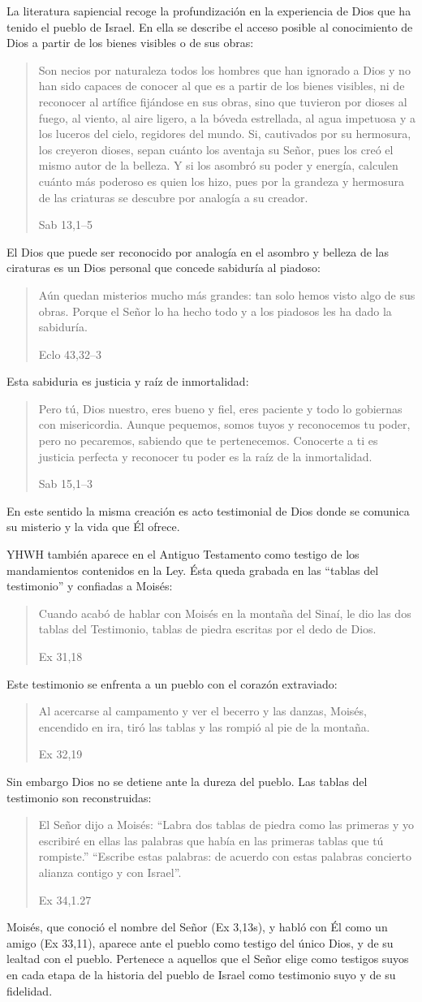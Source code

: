 La literatura sapiencial recoge la profundización en la experiencia de Dios que
ha tenido el pueblo de Israel. En ella se describe el acceso posible al
conocimiento de Dios a partir de los bienes visibles o de sus obras:
\blockquote[Sab 13,1--5]{Son necios por naturaleza todos los hombres que han
  ignorado a Dios y no han sido capaces de conocer al que es a partir de los
  bienes visibles, ni de reconocer al artífice fijándose en sus obras, sino que
  tuvieron por dioses al fuego, al viento, al aire ligero, a la bóveda
  estrellada, al agua impetuosa y a los luceros del cielo, regidores del mundo.
  Si, cautivados por su hermosura, los creyeron dioses, sepan cuánto los
  aventaja su Señor, pues los creó el mismo autor de la belleza. Y si los
  asombró su poder y energía, calculen cuánto más poderoso es quien los hizo,
  pues por la grandeza y hermosura de las criaturas se descubre por analogía a
  su creador.}

El Dios que puede ser reconocido por analogía en el asombro y belleza de las
ciraturas es un Dios personal que concede sabiduría al piadoso:
\blockquote[Eclo 43,32--3]{Aún quedan misterios mucho más grandes: tan solo
  hemos visto algo de sus obras. Porque el Señor lo ha hecho todo y a los
  piadosos les ha dado la sabiduría.}
Esta sabiduria es justicia y raíz de inmortalidad:
\blockquote[Sab 15,1--3]{Pero tú, Dios nuestro, eres bueno y fiel, eres paciente
  y todo lo gobiernas con misericordia. Aunque pequemos, somos tuyos y
  reconocemos tu poder, pero no pecaremos, sabiendo que te pertenecemos.
  Conocerte a ti es justicia perfecta y reconocer tu poder es la raíz de la
  inmortalidad.}
En este sentido la misma creación es acto testimonial de Dios donde se comunica
su misterio y la vida que Él ofrece.

YHWH también aparece en el Antiguo Testamento como testigo de los mandamientos
contenidos en la Ley.\autocite[Cf.][115]{prades2015testimonio} Ésta queda
grabada en las \enquote{tablas del testimonio} y confiadas a Moisés:
\blockquote[Ex 31,18]{Cuando acabó de hablar con Moisés en la montaña del Sinaí,
  le dio las dos tablas del Testimonio, tablas de piedra escritas por el dedo de
  Dios.}
Este testimonio se enfrenta a un pueblo con el corazón extraviado:
\blockquote[Ex 32,19]{Al acercarse al campamento y ver el becerro y las danzas,
  Moisés, encendido en ira, tiró las tablas y las rompió al pie de la montaña.}
Sin embargo Dios no se detiene ante la dureza del pueblo. Las tablas del
testimonio son reconstruidas:
\blockquote[Ex 34,1.27]{El Señor dijo a Moisés: \enquote{Labra dos tablas de
    piedra como las primeras y yo escribiré en ellas las palabras que había en
    las primeras tablas que tú rompiste.} \textelp{} \enquote{Escribe estas
    palabras: de acuerdo con estas palabras concierto alianza contigo y con
    Israel}.}
Moisés, que conoció el nombre del Señor (Ex 3,13s), y habló con Él como un amigo
(Ex 33,11), aparece ante el pueblo como testigo del único Dios, y de su lealtad
con el pueblo. Pertenece a aquellos que el Señor elige como testigos suyos en
cada etapa de la historia del pueblo de Israel como testimonio suyo y de su
fidelidad.

